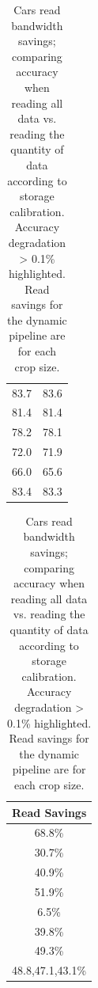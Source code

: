 \begin{table}
\begin{tabular}{|c|c|}
    83.7 & 83.6 \\ 
    81.4 & 81.4 \\ 
    78.2 & 78.1 \\ 
    72.0 & 71.9 \\ 
    66.0 & {\color{red}65.6} \\
    83.4 & 83.3 \\ 
    \end{tabular}
    \begin{tabular}{|c}
    \\
    Read Savings \\
    \hline
    68.8\%\\ 
    30.7\%\\ 
    40.9\%\\ 
    51.9\%\\ 
    6.5\%\\ 
    39.8\%\\ 
    49.3\% \\
    48.8,47.1,43.1\%\\ 
    \end{tabular}
    \caption{Cars read bandwidth savings; comparing accuracy when reading all data vs. reading the quantity of data according to storage calibration. Accuracy degradation > 0.1\% highlighted.
    Read savings for the dynamic pipeline are for each crop size.
    }
    \label{tab:cars_storage}
\end{table}

